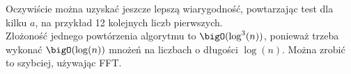 Oczywiście można uzyskać jeszcze lepszą wiarygodność, powtarzając test dla kilku \( a \), na przykład 12 kolejnych liczb pierwszych. \\
Złożoność jednego powtórzenia algorytmu to \( \bigO(\log^3(n)) \), ponieważ trzeba wykonać \( \bigO(\log(n)) \) mnożeń na liczbach o długości \( \log(n) \). Można zrobić to szybciej, używając FFT.
